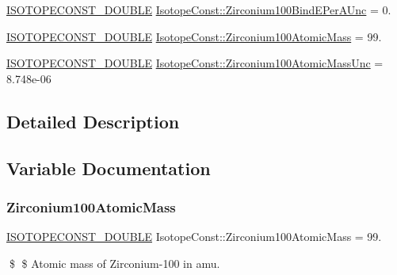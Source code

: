 \begin{DoxyCompactItemize}
\mbox{\hyperlink{group___isotope_const-_macros_ga8f45a7272ce02c0b4c65c44636ed719a}{I\+S\+O\+T\+O\+P\+E\+C\+O\+N\+S\+T\+\_\+\+D\+O\+U\+B\+LE}} \mbox{\hyperlink{group___isotope_const-_zirconium-_zr100_gab5b2e4e04dcb098a2cdc9629d3e0e498}{Isotope\+Const\+::\+Zirconium100\+Bind\+E\+Per\+A\+Unc}} = 0.
\item 
\mbox{\hyperlink{group___isotope_const-_macros_ga8f45a7272ce02c0b4c65c44636ed719a}{I\+S\+O\+T\+O\+P\+E\+C\+O\+N\+S\+T\+\_\+\+D\+O\+U\+B\+LE}} \mbox{\hyperlink{group___isotope_const-_zirconium-_zr100_ga406c990d18876b9b46d39de90f03e1da}{Isotope\+Const\+::\+Zirconium100\+Atomic\+Mass}} = 99.
\item 
\mbox{\hyperlink{group___isotope_const-_macros_ga8f45a7272ce02c0b4c65c44636ed719a}{I\+S\+O\+T\+O\+P\+E\+C\+O\+N\+S\+T\+\_\+\+D\+O\+U\+B\+LE}} \mbox{\hyperlink{group___isotope_const-_zirconium-_zr100_ga734b0852300e3cffa34732e2d5a7be66}{Isotope\+Const\+::\+Zirconium100\+Atomic\+Mass\+Unc}} = 8.\+748e-\/06
\end{DoxyCompactItemize}


\subsection{Detailed Description}


\subsection{Variable Documentation}
\mbox{\label{group___isotope_const-_zirconium-_zr100_ga406c990d18876b9b46d39de90f03e1da}} 
\subsubsection{\texorpdfstring{Zirconium100\+Atomic\+Mass}{Zirconium100AtomicMass}}
{\footnotesize\ttfamily \mbox{\hyperlink{group___isotope_const-_macros_ga8f45a7272ce02c0b4c65c44636ed719a}{I\+S\+O\+T\+O\+P\+E\+C\+O\+N\+S\+T\+\_\+\+D\+O\+U\+B\+LE}} Isotope\+Const\+::\+Zirconium100\+Atomic\+Mass = 99.}

\$ \$ Atomic mass of Zirconium-\/100 in amu. \mbox{\label{group___isotope_const-_zirconium-_zr100_ga734b0852300e3cffa34732e2d5a7be66}} 
